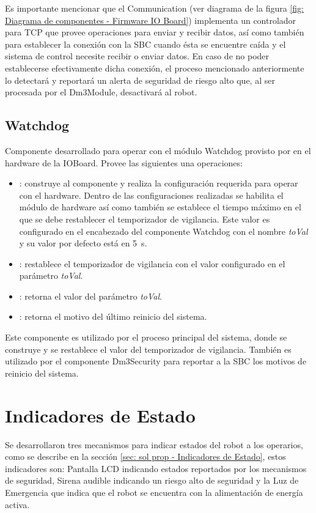 \documentclass[withindex,glossary]{cam-thesis}
\begin{document}
Es importante mencionar que el Communication (ver diagrama de la figura \ref{fig: Diagrama de componentes - Firmware IO Board}) implementa un controlador para TCP que provee operaciones para enviar y recibir datos, así como también para establecer la conexión con la SBC cuando ésta se encuentre caída y el sistema de control necesite recibir o enviar datos. En caso de no poder establecerse efectivamente dicha conexión, el proceso mencionado anteriormente lo detectará y reportará un alerta de seguridad de riesgo alto que, al ser procesada por el Dm3Module, desactivará al robot. 

\subsection{Watchdog}
Componente desarrollado para operar con el módulo Watchdog provisto por en el hardware de la IOBoard. Provee las siguientes una operaciones:
\begin{itemize}
\item {}: construye al componente y realiza la configuración requerida para operar con el hardware. Dentro de las configuraciones realizadas se habilita el módulo de hardware así como también se establece el tiempo máximo en el que se debe restablecer el temporizador de vigilancia. Este valor es configurado en el encabezado del componente Watchdog con el nombre \textit{toVal} y su valor por defecto está en \SI{5}{\second}.  	
\item {}: restablece el temporizador de vigilancia con el valor configurado en el parámetro \textit{toVal}.
\item {}: retorna el valor del parámetro \textit{toVal}.
\item {}: retorna el motivo del último reinicio del sistema.
\end{itemize}

Este componente es utilizado por el proceso principal del sistema, donde se construye y se restablece el valor del temporizador de vigilancia. También es utilizado por el componente Dm3Security para reportar a la SBC los motivos de reinicio del sistema.

\section{Indicadores de Estado} \label{sec: Implementación :: Indicadores de Estado}
Se desarrollaron tres mecanismos para indicar estados del robot a los operarios, como se describe en la sección \ref{sec: sol prop - Indicadores de Estado}, estos indicadores son: Pantalla LCD indicando estados reportados por los mecanismos de seguridad, Sirena audible indicando un riesgo alto de seguridad y la Luz de Emergencia que indica que el robot se encuentra con la alimentación de energía activa.
\end{document}
